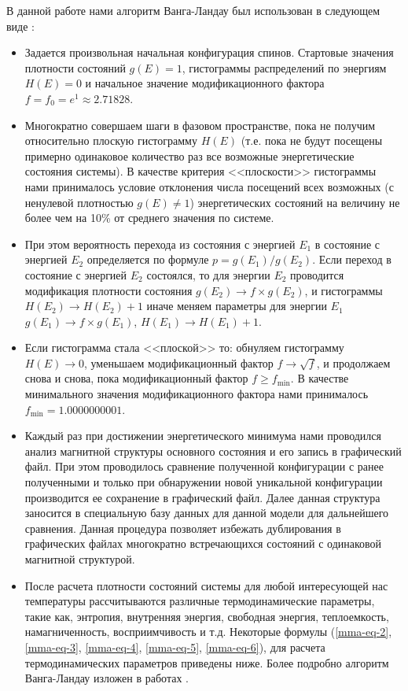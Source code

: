В данной работе нами алгоритм Ванга-Ландау был использован в следующем виде \cite{mma-bib-10, mma-bib-11, mma-bib-12}:
\begin{itemize}
    \item Задается произвольная начальная конфигурация спинов. Стартовые значения плотности состояний $g(E) = 1$, гистограммы распределений по энергиям $H(E) = 0$ и начальное значение модификационного фактора $f = f_0 = e^1 \approx 2.71828$.
    \item Многократно совершаем шаги в фазовом пространстве, пока не получим относительно плоскую гистограмму $H(E)$ (т.е. пока не будут посещены примерно одинаковое количество раз все возможные энергетические состояния системы). В качестве критерия <<плоскости>> гистограммы нами принималось условие отклонения числа посещений всех возможных (с ненулевой плотностью $g(E) \neq 1$) энергетических состояний на величину не более чем на 10\% от среднего значения по системе.
    \item При этом вероятность перехода из состояния с энергией $E_1$ в состояние с энергией $E_2$ определяется по формуле $p = g(E_1)/g(E_2)$. Если переход в состояние с энергией $E_2$ состоялся, то для энергии $E_2$ проводится модификация плотности состояния $g(E_2) \to f \times g(E_2)$, и гистограммы $H(E_2) \to H(E_2) + 1$ иначе меняем параметры для энергии $E_1$ $g(E_1) \to f \times g(E_1)$, $H(E_1) \to H(E_1) + 1$.
    \item Если гистограмма стала <<плоской>> то: обнуляем гистограмму $H(E) \to 0$,  уменьшаем модификационный фактор $f \to \sqrt{f}$, и продолжаем снова и снова, пока модификационный фактор $f \geq f_{\min}$. В качестве минимального значения модификационного фактора нами принималось $f_{\min} = 1.0000000001$.
    \item Каждый раз при достижении энергетического минимума нами проводился анализ магнитной структуры основного состояния и его запись в графический файл. При этом проводилось сравнение полученной конфигурации с ранее полученными и только при обнаружении новой уникальной конфигурации производится ее сохранение в графический файл. Далее данная структура заносится в специальную базу данных для данной модели для дальнейшего сравнения. Данная процедура позволяет избежать дублирования в графических файлах многократно встречающихся состояний с одинаковой магнитной структурой.
    \item После расчета плотности состояний системы для любой интересующей нас температуры рассчитываются различные термодинамические параметры, такие как, энтропия, внутренняя энергия, свободная энергия, теплоемкость, намагниченность, восприимчивость и т.д. Некоторые формулы (\eqref{mma-eq-2}, \eqref{mma-eq-3}, \eqref{mma-eq-4}, \eqref{mma-eq-5}, \eqref{mma-eq-6}), для расчета термодинамических параметров приведены ниже.
    Более подробно алгоритм Ванга-Ландау изложен в работах \cite{mma-bib-10, mma-bib-11, mma-bib-12, mma-bib-13, mma-bib-14, mma-bib-15}.
\end{itemize}

